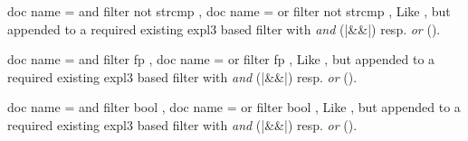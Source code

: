 \documentclass[a4paper,11pt]{ltxdoc}
\begin{document}
\begin{docCsvKeys}[
    doc parameter   = {=\marg{stringA}\marg{stringB}},
    doc description = {no default},
    doc new = {2022-10-21}
  ]
  {
    { doc name = and filter not strcmp  },
    { doc name = or filter not strcmp },
  }
  Like , but appended to a required existing
  expl3 based filter with \emph{and} (|&&|) resp. \emph{or} (\texttt{\textbar\textbar}).
\end{docCsvKeys}


\begin{docCsvKeys}[
    doc parameter   = {=\marg{floating point comparison}},
    doc description = {style, no default},
    doc new = {2022-10-21}
  ]
  {
    { doc name = and filter fp  },
    { doc name = or filter fp },
  }
  Like , but appended to a required existing
  expl3 based filter with \emph{and} (|&&|) resp. \emph{or} (\texttt{\textbar\textbar}).
\begin{dispExample}
\end{dispExample}
\end{docCsvKeys}

\enlargethispage*{1cm}
\begin{docCsvKeys}[
    doc parameter   = {=\marg{boolean expression}},
    doc description = {style, no default},
    doc new = {2022-10-21}
  ]
  {
    { doc name = and filter bool },
    { doc name = or filter bool },
  }
  Like , but appended to a required existing
  expl3 based filter with \emph{and} (|&&|) resp. \emph{or} (\texttt{\textbar\textbar}).
\end{docCsvKeys}


\clearpage
\end{document}
